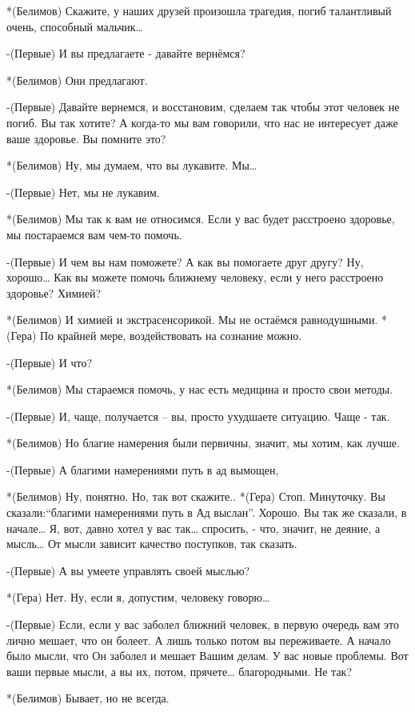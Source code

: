 *(Белимов) Скажите, у наших друзей произошла трагедия, погиб талантливый очень, способный мальчик…

-(Первые) И вы предлагаете - давайте вернёмся?

*(Белимов) Они предлагают.

-(Первые) Давайте вернемся, и восстановим, сделаем так чтобы этот человек не погиб. Вы так хотите? А когда-то мы вам говорили, что нас не интересует даже ваше здоровье. Вы помните это?

*(Белимов) Ну, мы думаем, что вы лукавите. Мы…

-(Первые) Нет, мы не лукавим.

*(Белимов) Мы так к вам не относимся. Если у вас будет расстроено здоровье,  мы постараемся вам чем-то помочь.

-(Первые) И чем вы нам поможете? А как вы помогаете друг другу? Ну, хорошо… Как вы можете помочь ближнему человеку, если у него расстроено здоровье? Химией?

*(Белимов) И химией и экстрасенсорикой. Мы не остаёмся равнодушными.
*(Гера) По крайней мере, воздействовать на сознание можно.

-(Первые) И что?

*(Белимов) Мы стараемся помочь, у нас есть медицина и просто свои методы.

-(Первые) И, чаще, получается – вы, просто ухудшаете ситуацию. Чаще - так.

*(Белимов) Но благие намерения были первичны, значит, мы хотим, как лучше. 

-(Первые) А благими намерениями путь в ад вымощен, 

*(Белимов) Ну, понятно. Но, так вот скажите..
*(Гера) Стоп. Минуточку. Вы сказали:“благими намерениями путь в Ад выслан”. Хорошо. Вы так же сказали, в начале… Я, вот, давно хотел у вас так… спросить, - что, значит, не деяние, а мысль… От мысли зависит качество поступков, так сказать.

-(Первые) А вы умеете управлять своей мыслью?

*(Гера) Нет. Ну, если я, допустим, человеку говорю…

-(Первые) Если, если у вас заболел ближний человек, в первую очередь вам это лично мешает, что он болеет. А лишь только потом вы переживаете. А начало было мысли, что Он заболел и мешает Вашим делам. У вас новые проблемы. Вот ваши первые мысли, а вы их, потом, прячете… благородными. Не так?

*(Белимов) Бывает, но не всегда.

